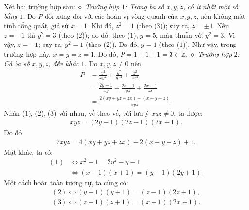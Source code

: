 \begin{multicols}{2}
	\vskip 0.05cm                                     
	Xét hai trường hợp sau:
	\vskip 0.05cm
	$\diamond$ \textit{Trường hợp $1$: Trong ba số $x, y, z$, có ít nhất một số bằng $1$.}
	\vskip 0.05cm
	Do $P$ đối xứng đối với các hoán vị vòng quanh của $x, y, z$, nên không mất tính tổng quát, giả sử $x = 1$.
	\vskip 0.05cm
	Khi đó, $z^2 = 1$ (theo ($3$)); suy ra, $z = \pm 1$.
	\vskip 0.05cm 
	Nếu $z = -1$ thì $y^2= 3$  (theo ($2$)); do đó, theo ($1$), $y = 5$, mâu thuẫn với  $y^2 = 3$.
	\vskip 0.05cm
	Vì vậy, $z = -1$; suy ra, $y^2 = 1$ (theo ($2$)). Do đó, $y = 1$ (theo ($1$)).
	\vskip 0.05cm
	Như vậy, trong trường hợp này, $x \!=\! y \!=\! z \!=\! 1$. Do đó,  $P = 1+ 1+ 1 = 3 \in \mathbb{Z}$.
	\vskip 0.05cm
	$\diamond$ \textit{Trường hợp $2$: Cả ba số $x, y, z$, đều khác $1$.}
	\vskip 0.05cm
	Do $x, y, z \ne 0$ nên
	\begin{align*}
		P &= \frac{{{x^2}}}{{x{y^2}}} + \frac{{{y^2}}}{{y{z^2}}} + \frac{{{z^2}}}{{z{x^2}}} \\
		&= \frac{{2y - 1}}{{xy}} + \frac{{2z - 1}}{{yz}} + \frac{{2x - 1}}{{zx}} \\
		&= \frac{{2\left( {xy + yz + zx} \right) - \left( {x + y + z} \right)}}{{xyz}}. \tag{$5$}
	\end{align*}
	Nhân ($1$), ($2$), ($3$) với nhau, vế theo vế, với lưu ý $xyz \ne 0$, ta được:
	\begin{align*}
		xyz = \left( {2y - 1} \right)\left( {2z - 1} \right)\left( {2x - 1} \right).
	\end{align*}
	Do đó
	\begin{align*}
		7xyz \!=\! 4\!\left( {xy \!+\! yz \!+\! zx} \right) \!-\! 2\!\left( {x \!+\! y \!+\! z} \!\right) \!+\!\! 1. \tag{$6$}
	\end{align*}
	Mặt khác, ta có:
	\begin{align*}
		(1) &\Leftrightarrow {x^2} - 1 = 2{y^2} - y - 1\\
		&\Leftrightarrow\! \left( {x \!-\! 1} \right)\!\left( {x \!+\! 1} \right)\! =\! \left( {y \!-\! 1} \right)\!\left( {2y \!+\! 1} \right). \tag{$7$}
	\end{align*}
	Một cách hoàn toàn tương tự, ta cũng có:
	\begin{align*}
		(2) \!\Leftrightarrow\! \left( {y \!-\! 1} \right)\left( {y \!+\! 1} \right) \!=\! \left( {z \!-\! 1} \right)\left( {2z \!+\! 1} \right), \tag{$8$}\\
		(3) \!\Leftrightarrow\! \left( {z \!-\! 1} \right)\left( {z \!+\! 1} \right) \!=\! \left( {x \!-\! 1} \right)\left( {2x \!+\! 1} \right). \tag{$9$}
	\end{align*}

\end{multicols}
